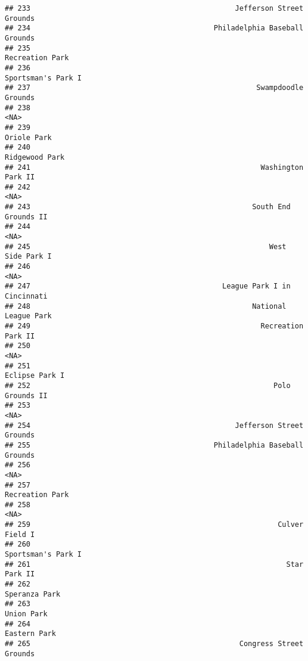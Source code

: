 \documentclass[]{article}
\begin{document}
\begin{verbatim}
## 233                                                Jefferson Street Grounds
## 234                                           Philadelphia Baseball Grounds
## 235                                                         Recreation Park
## 236                                                      Sportsman's Park I
## 237                                                     Swampdoodle Grounds
## 238                                                                    <NA>
## 239                                                             Oriole Park
## 240                                                          Ridgewood Park
## 241                                                      Washington Park II
## 242                                                                    <NA>
## 243                                                    South End Grounds II
## 244                                                                    <NA>
## 245                                                        West Side Park I
## 246                                                                    <NA>
## 247                                             League Park I in Cincinnati
## 248                                                    National League Park
## 249                                                      Recreation Park II
## 250                                                                    <NA>
## 251                                                          Eclipse Park I
## 252                                                         Polo Grounds II
## 253                                                                    <NA>
## 254                                                Jefferson Street Grounds
## 255                                           Philadelphia Baseball Grounds
## 256                                                                    <NA>
## 257                                                         Recreation Park
## 258                                                                    <NA>
## 259                                                          Culver Field I
## 260                                                      Sportsman's Park I
## 261                                                            Star Park II
## 262                                                           Speranza Park
## 263                                                              Union Park
## 264                                                            Eastern Park
## 265                                                 Congress Street Grounds

\end{verbatim}
\end{document}
